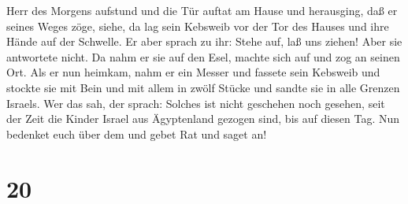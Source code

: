 Herr des Morgens aufstund und die Tür auftat am Hause und herausging,
daß er seines Weges zöge, siehe, da lag sein Kebsweib vor der Tor des
Hauses und ihre Hände auf der Schwelle.  Er aber sprach zu
ihr: Stehe auf, laß uns ziehen! Aber sie antwortete nicht. Da nahm er
sie auf den Esel, machte sich auf und zog an seinen Ort. 
Als er nun heimkam, nahm er ein Messer und fassete sein Kebsweib und
stockte sie mit Bein und mit allem in zwölf Stücke und sandte sie in
alle Grenzen Israels.  Wer das sah, der sprach: Solches ist
nicht geschehen noch gesehen, seit der Zeit die Kinder Israel aus
Ägyptenland gezogen sind, bis auf diesen Tag. Nun bedenket euch über dem
und gebet Rat und saget an!

\hypertarget{section-19}{%
\section{20}\label{section-19}}

